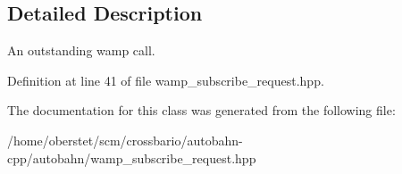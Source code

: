 \subsection{Detailed Description}
An outstanding wamp call. 

Definition at line 41 of file wamp\+\_\+subscribe\+\_\+request.\+hpp.



The documentation for this class was generated from the following file\+:\begin{DoxyCompactItemize}
\item 
/home/oberstet/scm/crossbario/autobahn-\/cpp/autobahn/wamp\+\_\+subscribe\+\_\+request.\+hpp\end{DoxyCompactItemize}
